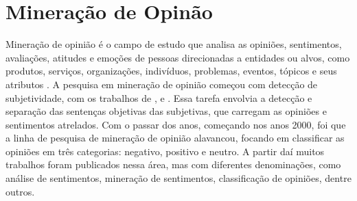 \documentclass[template.tex]{subfiles}
\begin{document}
%
%
%
%

\section{Mineração de Opinão}

Mineração de opinião é o campo de estudo que analisa as opiniões, sentimentos, avaliações, atitudes e emoções de pessoas direcionadas a entidades ou alvos, como produtos, serviços, organizações, indivíduos, problemas, eventos, tópicos e seus atributos \cite{bing:2012}. A pesquisa em mineração de opinião começou com detecção de subjetividade, com os trabalhos de ,  e . Essa tarefa envolvia a detecção e separação das sentenças objetivas das subjetivas, que carregam as opiniões e sentimentos atrelados. Com o passar dos anos, começando nos anos 2000, foi que a linha de pesquisa de mineração de opinião alavancou, focando em classificar as opiniões em três categorias: negativo, positivo e neutro. A partir daí muitos trabalhos foram publicados nessa área, mas com diferentes denominações, como análise de sentimentos, mineração de sentimentos, classificação de opiniões, dentre outros. 
\end{document}
